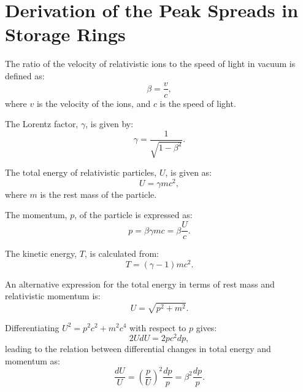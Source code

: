 
\chapter{Derivation of the Peak Spreads in Storage Rings}
\label{apdx:derivations}

The ratio of the velocity of relativistic ions to the speed of light in vacuum is defined as:
\begin{equation}\label{eq:apdx6:beta}
\beta = \frac{v}{c},
\end{equation}
where $v$ is the velocity of the ions, and $c$ is the speed of light.

The Lorentz factor, $\gamma$, is given by:
\begin{equation}\label{eq:apdx6:gamma}
\gamma = \frac{1}{\sqrt{1 - \beta^2}}.
\end{equation}

The total energy of relativistic particles, $U$, is given as:
\begin{equation}\label{eq:apdx6:U}
U = \gamma mc^2,
\end{equation}
where $m$ is the rest mass of the particle.

The momentum, $p$, of the particle is expressed as:
\begin{equation}\label{eq:apdx6:p}
p = \beta \gamma mc = \beta \frac{U}{c}.
\end{equation}

The kinetic energy, $T$, is calculated from:
\begin{equation}\label{eq:apdx6:T}
T = (\gamma - 1)mc^2.
\end{equation}

An alternative expression for the total energy in terms of rest mass and relativistic momentum is:
\begin{equation}\label{eq:apdx6:U_alternate}
U = \sqrt{p^2 + m^2}.
\end{equation}

Differentiating $U^2 = p^2c^2 + m^2c^4$ with respect to $p$ gives:
\begin{equation}\label{eq:apdx6:Udif}
2UdU = 2pc^2dp,
\end{equation}
leading to the relation between differential changes in total energy and momentum as:
\begin{equation}\label{eq:apdx6:dUU}
  \frac{dU}{U} = \left(\frac{p}{U}\right)^2 \frac{dp}{p} = \beta^2 \frac{dp}{p}.
\end{equation}

